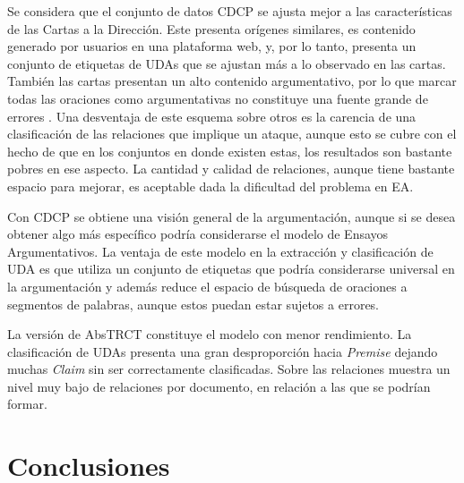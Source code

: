 \documentclass[a4paper,11pt,twocolumn,twoside]{article}
\begin{document}
Se considera que el conjunto de datos CDCP se ajusta mejor a las características de las Cartas 
a la Dirección. Este presenta orígenes similares, es contenido generado por usuarios en una plataforma
web, y, por lo tanto, presenta un conjunto de etiquetas de UDAs que se ajustan más a lo observado 
en las cartas. También las cartas presentan un alto contenido argumentativo, por lo que marcar 
todas las oraciones como argumentativas no constituye una fuente grande de errores
. Una desventaja de este esquema sobre otros es la carencia de una 
clasificación de las relaciones que implique un ataque, aunque esto se cubre con el hecho de 
que en los conjuntos en donde existen estas, los resultados son bastante pobres en ese aspecto. La cantidad 
y calidad de relaciones, aunque tiene bastante espacio para mejorar, es aceptable dada la dificultad 
del problema en EA.

Con CDCP se obtiene una visión general de la argumentación, aunque si se desea obtener algo 
más específico podría considerarse el modelo de Ensayos Argumentativos. La ventaja de este 
modelo en la extracción y clasificación de UDA es que utiliza un conjunto de etiquetas que 
podría considerarse universal en la argumentación y además reduce el espacio de búsqueda de 
oraciones a segmentos de palabras, aunque estos puedan estar sujetos a errores. 

La versión de AbsTRCT constituye el modelo con menor rendimiento. La clasificación
de UDAs presenta una gran desproporción hacia \textit{Premise} dejando muchas \textit{Claim}
sin ser correctamente clasificadas. Sobre las relaciones muestra un nivel muy bajo de 
relaciones por documento, en relación a las que se podrían formar.

\section{Conclusiones}
\end{document}
